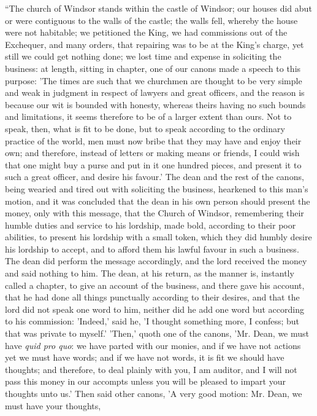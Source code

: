 ``The church of Windsor stands within
the castle of Windsor; our houses did abut or were contiguous to the
walls of the castle; the walls fell, whereby the house were not
habitable; we petitioned the King, we had commissions out of the
Exchequer, and many orders, that repairing was to be at the King's
charge, yet still we could get nothing done; we lost time and expense in
soliciting the business: at length, sitting in chapter, one of our
canons made a speech to this purpose: 'The times are such that we
churchmen are thought to be very simple and weak in judgment in respect
of lawyers and great officers, and the reason is because our wit is
bounded with honesty, whereas theirs having no such bounds and
limitations, it seems therefore to be of a larger extent than ours. Not
to speak, then, what is fit to be done, but to speak according to the
ordinary practice of the world, men must now bribe that they may have
and enjoy their own; and therefore, instead of letters or making means
or friends, I could wish that one might buy a purse and put in it one
hundred pieces, and present it to such a great officer, and desire his
favour.' The dean and the rest of the canons, being wearied and tired
out with soliciting the business, hearkened to this man's motion, and it
was concluded that the dean in his own person should present the money,
only with this message, that the Church of Windsor, remembering their
humble duties and service to his lordship, made bold, according to their
poor abilities, to present his lordship with a small token, which they
did humbly desire his lordship to accept, and to afford them his lawful
favour in such a business. The dean did perform the message accordingly,
and the lord received the money and said nothing to him. The dean, at
his return, as the manner is, instantly called a chapter, to give an
account of the business, and there gave his account, that he had done
all things punctually according to their desires, and that the lord did
not speak one word to him, neither did he add one word but according to
his commission: 'Indeed,' said he, 'I thought something more, I confess;
but that was private to myself.' 'Then,' quoth one of the canons, 'Mr.
Dean, we must have \emph{quid pro quo}: we have parted with our monies,
and if we have not actions yet we must have words; and if we have not
words, it is fit we should have thoughts; and therefore, to deal plainly
with you, I am auditor, and I will not pass this money in our accompts
unless you will be pleased to impart your thoughts unto us.' Then said
other canons, 'A very good motion: Mr. Dean, we must have your thoughts,
